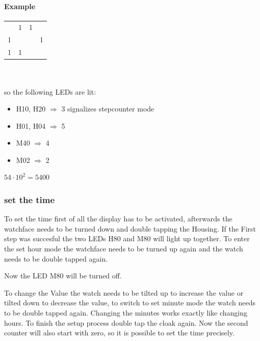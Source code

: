 \paragraph{Example}
\vspace{5mm}

\begin{tabular}{|c|c|c|c|}
\hline 
 &  &  &  \\ 
\hline 
 & 1 & 1 &  \\ 
\hline 
1 &  &  & 1 \\ 
\hline 
1 & 1 &  &  \\ 
\hline 
\end{tabular}\\
\vspace{5mm}\\
so the following LEDs are lit:
\begin{itemize}
	\item H10, H20 $\Rightarrow$ 3 signalizes stepcounter mode
	\item H01, H04 $\Rightarrow$ 5
	\item M40 $\Rightarrow$ 4
	\item M02 $\Rightarrow$ 2
\end{itemize}
$54 \cdot 10 ^{2} = 5400$
\subsubsection{set the time}
To set the time first of all the display has to be activated, afterwards the watchface needs to be turned down and double tapping the Housing.
If the First step was succesful the two LEDs H80 and M80 will light up together. To enter the set hour mode the watchface needs to be turned up again and the watch needs to be double tapped again.

Now the LED M80 will be turned off.

To change the Value the watch needs to be tilted up to increase the value or tilted down to decrease the value, to switch to set minute mode the watch needs to be double tapped again. Changing the minutes works exactly like changing hours. To finish the setup process double tap the cloak again. Now the second counter will also start with zero, so it is possible to set the time precisely.